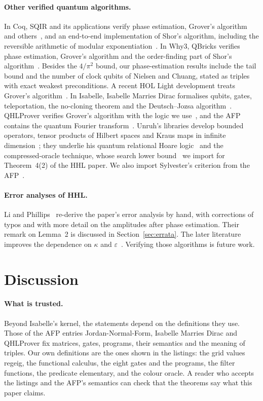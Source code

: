 \documentclass[runningheads]{llncs}
\DeclareRobustCommand{\isa}[1]{\textsf{\def\_{\char95\allowbreak}#1}}
\newcommand{\IMD}{Isabelle Marries Dirac}
\begin{document}
\paragraph{Other verified quantum algorithms.} In Coq, SQIR and its applications verify phase
estimation, Grover's algorithm and others~\cite{hietala2021sqir}, and an end-to-end implementation of
Shor's algorithm, including the reversible arithmetic of modular exponentiation~\cite{peng2023shor}. In
Why3, QBricks verifies phase estimation, Grover's algorithm and the order-finding part of Shor's
algorithm~\cite{chareton2021qbricks}. Besides the $4/\pi^2$ bound, our phase-estimation results include the tail
bound and the number of clock qubits of Nielsen and Chuang, stated as triples with exact weakest
preconditions. A recent HOL Light development treats Grover's
algorithm~\cite{sun2026grover}. In Isabelle, \IMD{} formalises qubits, gates, teleportation, the no-cloning
theorem and the Deutsch--Jozsa algorithm~\cite{bordg2021imd,bordg2020afp}. QHLProver verifies Grover's
algorithm with the logic we use~\cite{liu2019qhl}, and the AFP contains the quantum Fourier
transform~\cite{manrique2025qft}. Unruh's libraries develop bounded operators, tensor products of Hilbert
spaces and Kraus maps in infinite dimension~\cite{caballero2021cbo,unruh2024tensor,unruh2025kraus}; they
underlie his quantum relational Hoare logic~\cite{unruh2019qrhl} and the compressed-oracle technique,
whose search lower bound~\cite{unruh2025co} we import for Theorem~4(2) of the HHL paper. We also import
Sylvester's criterion from the AFP~\cite{binder2024hermitian}.

\paragraph{Error analyses of HHL.} Li and Phillips~\cite{liphillips2024} re-derive the paper's error
analysis by hand, with corrections of typos and with more detail on the amplitudes after phase
estimation. Their remark on Lemma~2 is discussed in Section~\ref{sec:errata}. The later literature
improves the dependence on $\kappa$ and $\varepsilon$~\cite{childs2017}. Verifying those algorithms is
future work.

\section{Discussion}\label{sec:discussion}

\paragraph{What is trusted.} Beyond Isabelle's kernel, the statements depend on the definitions they
use. Those of the AFP entries Jordan-Normal-Form, \IMD{} and QHLProver fix matrices, gates, programs,
their semantics and the meaning of triples. Our own definitions are the ones shown in the listings: the
grid values \isa{reg\_eig}, the functional calculus, the eight gates and the programs, the filter
functions, the predicate \isa{elementary}, and the colour oracle. A reader who accepts the listings and
the AFP's semantics can check that the theorems say what this paper claims.
\end{document}
